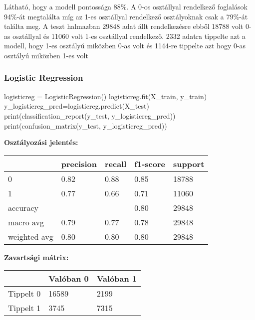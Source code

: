 \bigskip

Látható, hogy a modell pontossága 88\%. A 0-os osztállyal rendelkező foglalások 94\%-át megtalálta míg az 1-es osztállyal rendelkező osztályoknak csak a 79\%-át találta meg. A teszt halmazban 29848 adat állt rendelkezésre ebből 18788 volt 0-as osztállyal és 11060 volt 1-es osztállyal rendelkező. 2332 adatra tippelte azt a modell, hogy 1-es osztályú miközben 0-as volt és 1144-re tippelte azt hogy 0-as osztályú miközben 1-es volt

\subsubsection{Logistic Regression}
\begin{python}
logisticreg = LogisticRegression()
logisticreg.fit(X_train, y_train)
y_logisticreg_pred=logisticreg.predict(X_test)
print(classification_report(y_test, y_logisticreg_pred))
print(confusion_matrix(y_test, y_logisticreg_pred))
\end{python}

\medskip

\noindent \textbf{Osztályozási jelentés:}

\medskip

\begin{tabular}{|l|l|l|l|l|}
\hline
             & precision & recall & f1-score & support \\
             \hline
0            & 0.82      & 0.88   & 0.85     & 18788   \\
\hline
1            & 0.77      & 0.66   & 0.71     & 11060   \\
\hline
accuracy     &           &        & 0.80     & 29848   \\
\hline
macro avg    & 0.79      & 0.77   & 0.78     & 29848   \\
\hline
weighted avg & 0.80      & 0.80   & 0.80     & 29848  \\
\hline
\end{tabular}

\medskip

\noindent \textbf{Zavartsági mátrix:}

\medskip

\begin{tabular}{|l|l|l|}
\hline
          & Valóban 0 & Valóban 1 \\
          \hline
Tippelt 0 & 16589     & 2199      \\
\hline
Tippelt 1 & 3745      & 7315   \\
\hline
\end{tabular}

